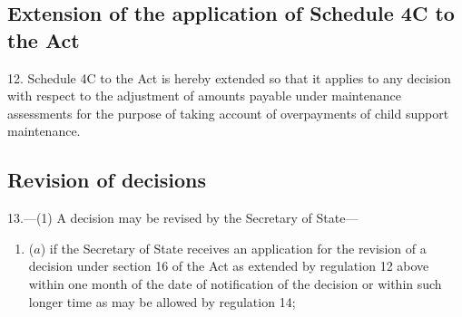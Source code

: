 \documentclass[12pt,a4paper]{article}
\begin{document}
{%
%
%
%
%
%


\subsection[12. Extension of the application of Schedule 4C to the Act]{Extension of the application of Schedule 4C to the Act}

12.  Schedule 4C to the Act is hereby extended so that it applies to any decision with respect to the adjustment of amounts payable under maintenance assessments for the purpose of taking account of overpayments of child support maintenance.


\subsection[13. Revision of decisions]{Revision of decisions}

13.—(1) A decision may be revised by the Secretary of State—
\begin{enumerate}\item[]
($a$) if the Secretary of State receives an application for the revision of a decision under section 16 of the Act as extended by regulation 12 above within one month of the date of notification of the decision or within such longer time as may be allowed by regulation 14;


\end{enumerate}}
\end{document}
